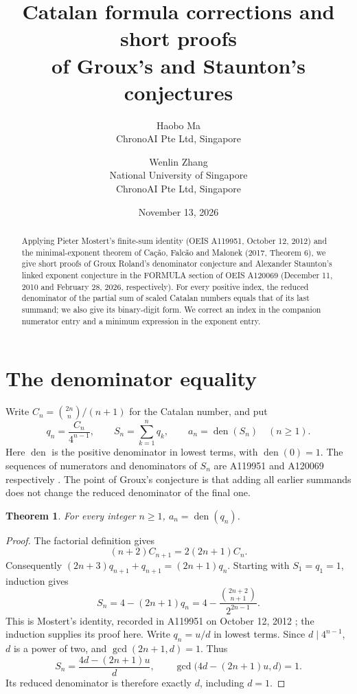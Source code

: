 \documentclass[11pt]{article}
\title{Catalan formula corrections and short proofs\\of Groux's and Staunton's conjectures}
\author{Haobo Ma\\\small ChronoAI Pte Ltd, Singapore
\and Wenlin Zhang\\\small National University of Singapore\\\small ChronoAI Pte Ltd, Singapore}
\date{November 13, 2026}
\newtheorem{theorem}{Theorem}
\newcommand{\den}{\operatorname{den}}
\begin{document}
\maketitle
\begin{abstract}
Applying Pieter Mostert's finite-sum identity (OEIS A119951,
October 12, 2012) and the minimal-exponent theorem of Ca\c{c}\~ao,
Falc\~ao and Malonek (2017, Theorem 6), we give short proofs of
Groux Roland's denominator conjecture and Alexander Staunton's
linked exponent conjecture in the FORMULA section of OEIS A120069
(December 11, 2010 and February 28, 2026, respectively).
For every positive index, the reduced denominator of the partial sum
of scaled Catalan numbers equals that of its last summand; we also
give its binary-digit form. We correct an index in the companion
numerator entry and a minimum expression in the exponent entry.
\end{abstract}

\section{The denominator equality}
Write $C_n=\binom{2n}{n}/(n+1)$ for the Catalan number, and put
\[
 q_n=\frac{C_n}{4^{n-1}},\qquad
 S_n=\sum_{k=1}^n q_k,\qquad a_n=\den(S_n)\quad(n\geq1).
\]
Here $\den$ is the positive denominator in lowest terms, with
$\den(0)=1$. The sequences of numerators and denominators of $S_n$
are A119951 and A120069 respectively \cite{numerators,groux}.
The point of Groux's conjecture is that adding all earlier summands
does not change the reduced denominator of the final one.

\begin{theorem}\label{thm:main}
For every integer $n\geq1$, $a_n=\den(q_n)$.
\end{theorem}
\begin{proof}
The factorial definition gives
\[
 (n+2)C_{n+1}=2(2n+1)C_n.
\]
Consequently $(2n+3)q_{n+1}+q_{n+1}=(2n+1)q_n$.
Starting with $S_1=q_1=1$, induction gives
\begin{equation}\label{eq:mostert}
 S_n=4-(2n+1)q_n
     =4-\frac{\binom{2n+2}{n+1}}{2^{2n-1}}.
\end{equation}
This is Mostert's identity, recorded in A119951 on October 12, 2012
\cite{numerators}; the induction supplies its proof here.
Write $q_n=u/d$ in lowest terms. Since $d\mid4^{n-1}$, $d$ is a power
of two, and $\gcd(2n+1,d)=1$. Thus
\[
 S_n=\frac{4d-(2n+1)u}{d},\qquad
 \gcd\bigl(4d-(2n+1)u,d\bigr)=1.
\]
Its reduced denominator is therefore exactly $d$, including $d=1$.
\end{proof}
\end{document}
